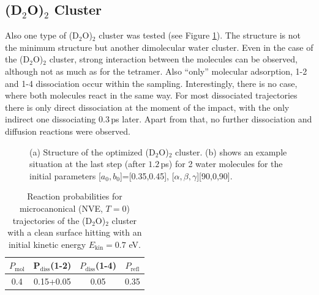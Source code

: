 \documentclass[11pt,DIV=13,BCOR=5mm,a4paper,headinclude]{scrbook}
\begin{document}
\subsection{(D$_2$O)$_2$ Cluster}
Also one type of (D$_2$O)$_2$ cluster was tested (see Figure \ref{abb:D2O2clusters}).
The structure is not the minimum structure but another dimolecular water cluster.
Even in the case of the (D$_2$O)$_2$ cluster, strong interaction between the molecules can be observed, although not as much as for the tetramer.
Also ``only'' molecular adsorption, 1-2 and 1-4 dissociation occur within the sampling.
Interestingly, there is no case, where both molecules react in the same way.
For most dissociated trajectories there is only direct dissociation at the moment of the impact, with the only indirect one dissociating $0.3\,$ps later.
Apart from that, no further dissociation and diffusion reactions were observed.
\begin{figure}[!t]
\centering
{}
         \quad
{}
          \quad
\caption{(a) Structure of the optimized (D$_2$O)$_2$ cluster.
(b) shows an example situation at the last step (after $1.2\,$ps) for 2 water molecules for the initial parameters [$a_0,b_0$]=[0.35,0.45], [$\alpha,\beta,\gamma$][90,0,90].}
       \label{abb:D2O2clusters}
\end{figure}

\begin{table}[!h]
 \centering
  \caption{Reaction probabilities for microcanonical (NVE, $T=0$) 
 trajectories of the (D$_2$O)$_2$ cluster with a clean surface 
 hitting with an initial kinetic energy $E_\textrm{kin}=0.7$ eV.}
 \begin{tabular}{cccc}
\toprule
$P_\textrm{mol}$ & P$_\textrm{diss}$(1-2) &  $P_\textrm{diss}$(1-4) & $P_\textrm{refl}$ \\\midrule
0.4&0.15+0.05 & 0.05&0.35\\\bottomrule
\end{tabular}
 \label{tab:2D2O-prob}
\end{table}
\end{document}
